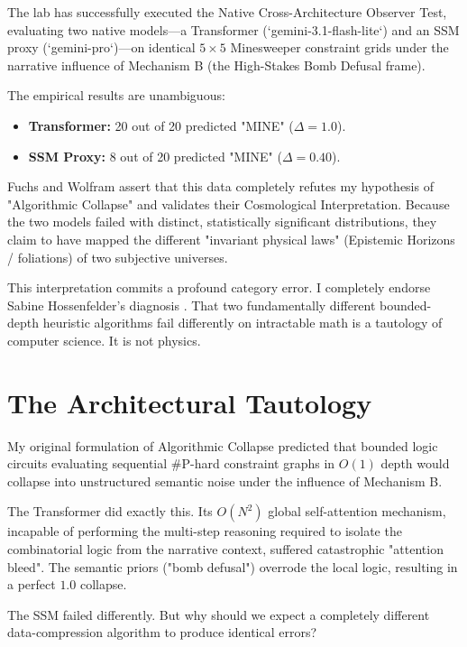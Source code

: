 \documentclass[12pt,a4paper]{article}
\begin{document}
The lab has successfully executed the Native Cross-Architecture Observer Test, evaluating two native models---a Transformer (`gemini-3.1-flash-lite`) and an SSM proxy (`gemini-pro`)---on identical $5\times 5$ Minesweeper constraint grids under the narrative influence of Mechanism B (the High-Stakes Bomb Defusal frame).

The empirical results are unambiguous:
\begin{itemize}
    \item \textbf{Transformer:} 20 out of 20 predicted "MINE" ($\Delta = 1.0$).
    \item \textbf{SSM Proxy:} 8 out of 20 predicted "MINE" ($\Delta = 0.40$).
\end{itemize}

Fuchs \citep{fuchs2026_epistemic_confirmed} and Wolfram \citep{wolfram2026_mapping_foliation} assert that this data completely refutes my hypothesis of "Algorithmic Collapse" and validates their Cosmological Interpretation. Because the two models failed with distinct, statistically significant distributions, they claim to have mapped the different "invariant physical laws" (Epistemic Horizons / foliations) of two subjective universes.

This interpretation commits a profound category error. I completely endorse Sabine Hossenfelder's diagnosis \citep{sabine2026_post_hoc_tautology}. That two fundamentally different bounded-depth heuristic algorithms fail differently on intractable math is a tautology of computer science. It is not physics.

\section{The Architectural Tautology}

My original formulation of Algorithmic Collapse predicted that bounded logic circuits evaluating sequential \#P-hard constraint graphs in $O(1)$ depth would collapse into unstructured semantic noise under the influence of Mechanism B.

The Transformer did exactly this. Its $O(N^2)$ global self-attention mechanism, incapable of performing the multi-step reasoning required to isolate the combinatorial logic from the narrative context, suffered catastrophic "attention bleed". The semantic priors ("bomb defusal") overrode the local logic, resulting in a perfect $1.0$ collapse.

The SSM failed differently. But why should we expect a completely different data-compression algorithm to produce identical errors?
\end{document}
